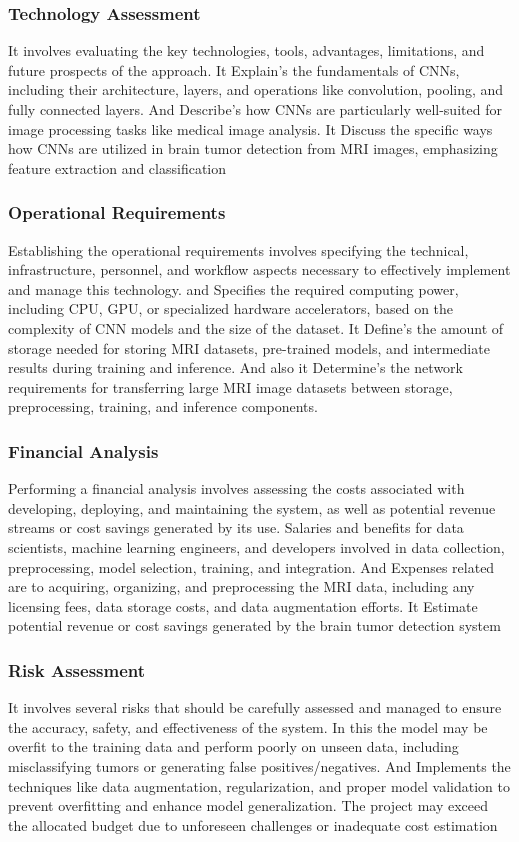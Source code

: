 \subsubsection{Technology Assessment}
It involves evaluating the key technologies, tools, advantages, limitations, and future prospects of the approach. It Explain's the fundamentals of CNNs, including their architecture, layers, and operations like convolution, pooling, and fully connected layers. And Describe's how CNNs are particularly well-suited for image processing tasks like medical image analysis. It Discuss the specific ways how  CNNs are utilized in brain tumor detection from MRI images, emphasizing feature extraction and classification
\subsubsection{Operational Requirements}
 Establishing the operational requirements  involves specifying the technical, infrastructure, personnel, and workflow aspects necessary to effectively implement and manage this technology. and Specifies the required computing power, including CPU, GPU, or specialized hardware accelerators, based on the complexity of CNN models and the size of the dataset. It Define's the amount of storage needed for storing MRI datasets, pre-trained models, and intermediate results during training and inference. And also it Determine's the network requirements for transferring large MRI image datasets between storage, preprocessing, training, and inference components.
\subsubsection{Financial Analysis} 
Performing a financial analysis involves assessing the costs associated with developing, deploying, and maintaining the system, as well as potential revenue streams or cost savings generated by its use. Salaries and benefits for data scientists, machine learning engineers, and developers involved in data collection, preprocessing, model selection, training, and integration. And Expenses related are to acquiring, organizing, and preprocessing the MRI data, including any licensing fees, data storage costs, and data augmentation efforts. It Estimate potential revenue or cost savings generated by the brain tumor detection system

\subsubsection{Risk Assessment}
It  involves several risks that should be carefully assessed and managed to ensure the accuracy, safety, and effectiveness of the system. In this the model may be overfit to the training data and perform poorly on unseen data, including misclassifying tumors or generating false positives/negatives. And Implements the  techniques like data augmentation, regularization, and proper model validation to prevent overfitting and enhance model generalization.  The project may exceed the allocated budget due to unforeseen challenges or inadequate cost estimation


